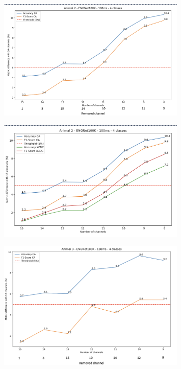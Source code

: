 \documentclass{Configuration_Files/PoliMi3i_thesis}
\begin{document}
\begin{figure}[h!]
    \centering
    \includegraphics[width=0.8\textwidth]{Results Matteo/figure13}
    \label{fig:figure1}
\end{figure}

\begin{figure}[h!]
    \centering
    \includegraphics[width=0.8\textwidth]{Results Matteo/figure14}
    \label{fig:figure1}
\end{figure}

\begin{figure}[h!]
    \centering
    \includegraphics[width=0.8\textwidth]{Results Matteo/figure15}
    \label{fig:figure1}
\end{figure}
\end{document}
